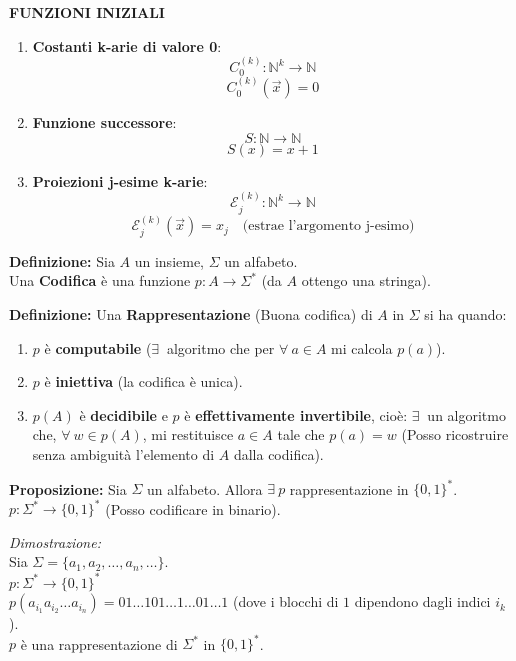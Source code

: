 \vspace{0.4cm}
\textbf{FUNZIONI INIZIALI}
\begin{enumerate}
    \item \textbf{Costanti k-arie di valore 0}:
    $$C_0^{(k)} : \mathbb{N}^k \to \mathbb{N}$$
    $$C_0^{(k)}(\vec{x}) = 0$$
    
    \item \textbf{Funzione successore}:
    $$S : \mathbb{N} \to \mathbb{N}$$
    $$S(x) = x + 1$$
    
    \item \textbf{Proiezioni j-esime k-arie}:
    $$\mathcal{E}_j^{(k)} : \mathbb{N}^k \to \mathbb{N}$$
    $$\mathcal{E}_j^{(k)}(\vec{x}) = x_j \quad \text{(estrae l'argomento j-esimo)}$$
\end{enumerate}

\vspace{0.4cm}
\textbf{Definizione:} Sia $A$ un insieme, $\Sigma$ un alfabeto. \\
Una \textbf{Codifica} è una funzione $p: A \to \Sigma^*$ (da $A$ ottengo una stringa).

\vspace{0.4cm}
\textbf{Definizione:} Una \textbf{Rappresentazione} (Buona codifica) di $A$ in $\Sigma$ si ha quando:
\begin{enumerate}
    \item $p$ è \textbf{computabile} ($\exists\ $ algoritmo che per $\forall\ a \in A$ mi calcola $p(a)$).
    \item $p$ è \textbf{iniettiva} (la codifica è unica).
    \item $p(A)$ è \textbf{decidibile} e $p$ è \textbf{effettivamente invertibile}, cioè: $\exists\ $ un algoritmo che, $\forall\ w \in p(A)$, mi restituisce $a \in A$ tale che $p(a) = w$ (Posso ricostruire senza ambiguità l'elemento di $A$ dalla codifica).
\end{enumerate}

\vspace{0.4cm}
\textbf{Proposizione:} Sia $\Sigma$ un alfabeto. Allora $\exists\ p$ rappresentazione in $\{0, 1\}^*$. \\
$p : \Sigma^* \to \{0, 1\}^*$ (Posso codificare in binario).

\textit{Dimostrazione:} \\
Sia $\Sigma = \{a_1, a_2, \dots, a_n, \dots\}$. \\
$p : \Sigma^* \to \{0, 1\}^*$ \\
$p(a_{i_1} a_{i_2} \dots a_{i_n}) = 01\dots101\dots1\dots01\dots1$ (dove i blocchi di $1$ dipendono dagli indici $i_k$). \\
$p$ è una rappresentazione di $\Sigma^*$ in $\{0, 1\}^*$.

